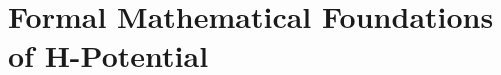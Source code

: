 \documentclass[12pt]{article}
\theoremstyle{definition}
\theoremstyle{remark}
\begin{document}
\section{Formal Mathematical Foundations of H-Potential}



\end{document}
